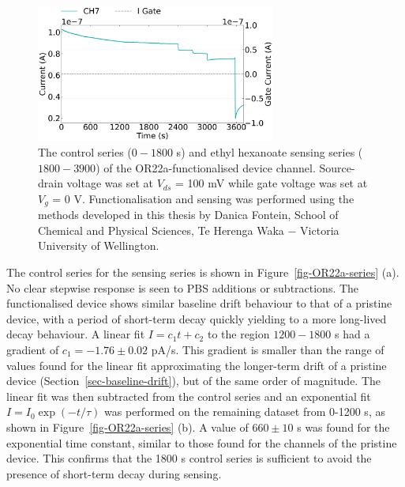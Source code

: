 \documentclass[
  a4paper,
]{scrbook}
\begin{document}
\begin{figure}

{\centering \includegraphics[width=0.7\textwidth,height=\textheight]{figures/ch7/Q1C6.png}

}

\caption[The control series and ethyl hexanoate sensing series of the
successfully OR22a-functionalised device
channel.]{\label{fig-EtHex-aqueous-sensing}The control series
(\(0-1800\) s) and ethyl hexanoate sensing series (\(1800-3900\)) of the
OR22a-functionalised device channel. Source-drain voltage was set at
\(V_{ds}\) = 100 mV while gate voltage was set at \(V_g\) = 0 V.
Functionalisation and sensing was performed using the methods developed
in this thesis by Danica Fontein, School of Chemical and Physical
Sciences, Te Herenga Waka \(-\) Victoria University of Wellington.}

\end{figure}

The control series for the sensing series is shown in
Figure~\ref{fig-OR22a-series} (a). No clear stepwise response is seen to
PBS additions or subtractions. The functionalised device shows similar
baseline drift behaviour to that of a pristine device, with a period of
short-term decay quickly yielding to a more long-lived decay behaviour.
A linear fit \(I = c_1t + c_2\) to the region \(1200-1800\) s had a
gradient of \(c_1 = -1.76 \pm 0.02\) pA/s. This gradient is smaller than
the range of values found for the linear fit approximating the
longer-term drift of a pristine device
(Section~\ref{sec-baseline-drift}), but of the same order of magnitude.
The linear fit was then subtracted from the control series and an
exponential fit \(I = I_0\exp(-t/\tau)\) was performed on the remaining
dataset from 0-1200 s, as shown in Figure~\ref{fig-OR22a-series} (b). A
value of \(660 \pm 10\) s was found for the exponential time constant,
similar to those found for the channels of the pristine device. This
confirms that the 1800 s control series is sufficient to avoid the
presence of short-term decay during sensing.
\end{document}
